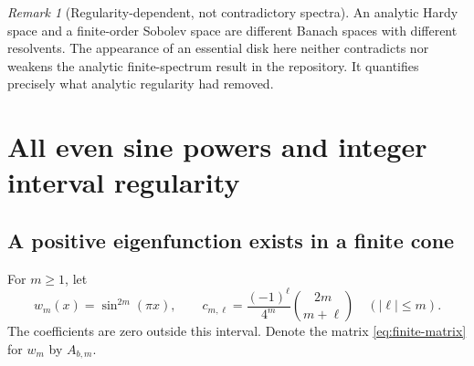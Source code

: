 \documentclass[11pt,a4paper]{article}
\theoremstyle{definition}
\theoremstyle{remark}
\newtheorem{remark}[theorem]{Remark}
\numberwithin{equation}{section}
\begin{document}
\begin{remark}[Regularity-dependent, not contradictory spectra]
An analytic Hardy space and a finite-order Sobolev space are different
Banach spaces with different resolvents. The appearance of an essential
disk here neither contradicts nor weakens the analytic finite-spectrum
result in the repository. It quantifies precisely what analytic regularity
had removed.
\end{remark}

\section{All even sine powers and integer interval regularity}
\label{sec:sine}

\subsection{A positive eigenfunction exists in a finite cone}
For $m\ge1$, let
\begin{equation}
 w_m(x)=\sin^{2m}(\pi x),\qquad
 c_{m,\ell}=\frac{(-1)^\ell}{4^m}\binom{2m}{m+\ell}
 \quad(|\ell|\le m).
 \label{eq:sine-coefficients}
\end{equation}
The coefficients are zero outside this interval. Denote the matrix
\eqref{eq:finite-matrix} for $w_m$ by $A_{b,m}$.
\end{document}
